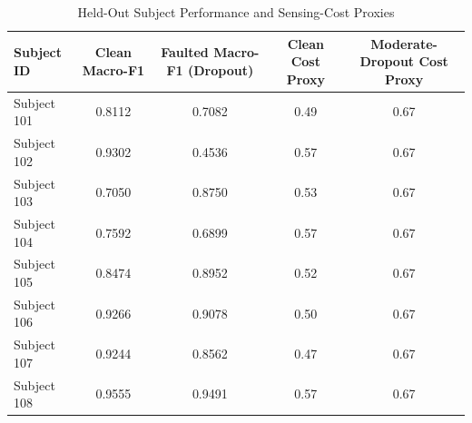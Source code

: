 \begin{table}[htbp]
\caption{Held-Out Subject Performance and Sensing-Cost Proxies}
\label{tab:per_subject}
\centering
\begin{tabular}{lcccc}
\hline
Subject ID & Clean Macro-F1 & Faulted Macro-F1 (Dropout) & Clean Cost Proxy & Moderate-Dropout Cost Proxy \\ \hline
Subject 101 & 0.8112 & 0.7082 & 0.49 & 0.67 \\
Subject 102 & 0.9302 & 0.4536 & 0.57 & 0.67 \\
Subject 103 & 0.7050 & 0.8750 & 0.53 & 0.67 \\
Subject 104 & 0.7592 & 0.6899 & 0.57 & 0.67 \\
Subject 105 & 0.8474 & 0.8952 & 0.52 & 0.67 \\
Subject 106 & 0.9266 & 0.9078 & 0.50 & 0.67 \\
Subject 107 & 0.9244 & 0.8562 & 0.47 & 0.67 \\
Subject 108 & 0.9555 & 0.9491 & 0.57 & 0.67 \\
\hline
\end{tabular}
\end{table}
